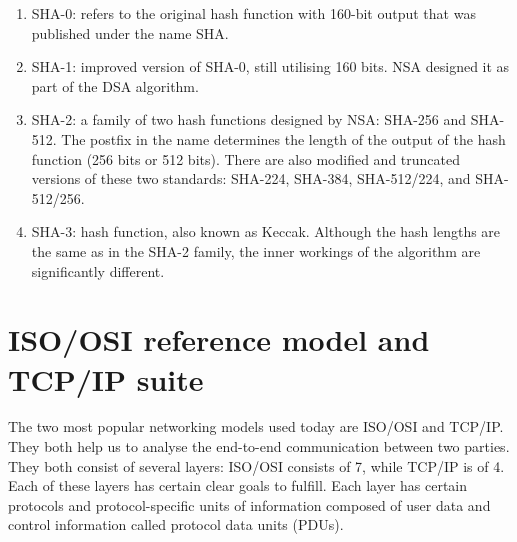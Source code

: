 \begin{itemize}
\begin{enumerate}
        \item SHA-0: refers to the original hash function with 160-bit output that was published under the name SHA.
        \item SHA-1: improved version of SHA-0, still utilising 160 bits. NSA designed it as part of the DSA algorithm.
        \item SHA-2: a family of two hash functions designed by NSA: SHA-256 and SHA-512. The postfix in the name determines the length of the output of the hash function (256 bits or 512 bits). There are also modified and truncated versions of these two standards: SHA-224, SHA-384, SHA-512/224, and SHA-512/256.
        \item SHA-3: hash function, also known as Keccak. Although the hash lengths are the same as in the SHA-2 family, the inner workings of the algorithm are significantly different.
    \end{enumerate}
\end{itemize}


\section{ISO/OSI reference model and TCP/IP suite}
The two most popular networking models used today are ISO/OSI and TCP/IP. They both help us to analyse the end-to-end communication between two parties. They both consist of several layers: ISO/OSI consists of 7, while TCP/IP is of 4. Each of these layers has certain clear goals to fulfill. Each layer has certain protocols and protocol-specific units of information composed of user data and control information called protocol data units (PDUs).

